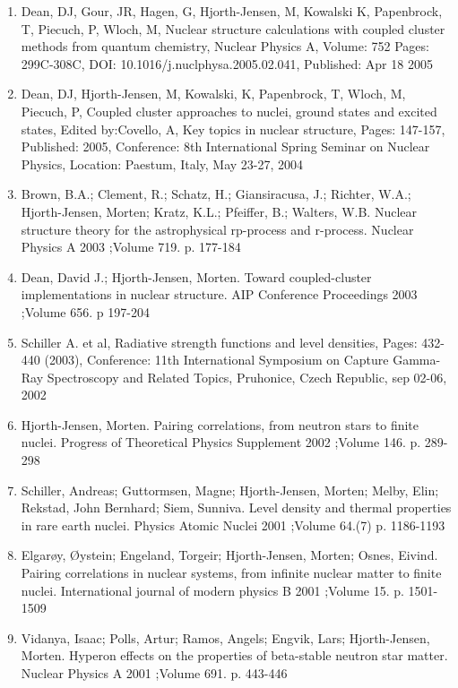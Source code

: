 \documentclass[a4wide,10pt]{article}
\begin{document}
\begin{enumerate}
\item Dean, DJ, Gour, JR, Hagen, G, Hjorth-Jensen, M, Kowalski K, Papenbrock, T, Piecuch, P, Wloch, M, Nuclear structure calculations with coupled cluster methods from quantum chemistry, Nuclear Physics A, Volume: 752  Pages: 299C-308C, DOI: 10.1016/j.nuclphysa.2005.02.041, Published: Apr 18 2005

\item Dean, DJ, Hjorth-Jensen, M, Kowalski, K, Papenbrock, T, Wloch, M, Piecuch, P, Coupled cluster approaches to nuclei, ground states and excited states, Edited by:Covello, A, Key topics in nuclear structure, Pages: 147-157, Published: 2005, Conference: 8th International Spring Seminar on Nuclear Physics, Location: Paestum, Italy, May 23-27, 2004

\item Brown, B.A.; Clement, R.; Schatz, H.; Giansiracusa, J.; Richter, W.A.; Hjorth-Jensen, Morten; Kratz, K.L.; Pfeiffer, B.; Walters, W.B.  Nuclear structure theory for the astrophysical rp-process and r-process. Nuclear Physics A 2003 ;Volume 719. p. 177-184

\item Dean, David J.; Hjorth-Jensen, Morten.  Toward coupled-cluster implementations in nuclear structure. AIP Conference Proceedings 2003 ;Volume 656. p 197-204

\item Schiller A. et al, Radiative strength functions and level densities, Pages: 432-440 (2003), Conference: 11th International Symposium on Capture Gamma-Ray Spectroscopy and Related Topics, Pruhonice, Czech Republic, sep 02-06, 2002

\item Hjorth-Jensen, Morten.  Pairing correlations, from neutron stars to finite nuclei. Progress of Theoretical Physics Supplement 2002 ;Volume 146. p. 289-298

\item Schiller, Andreas; Guttormsen, Magne; Hjorth-Jensen, Morten; Melby, Elin; Rekstad, John Bernhard; Siem, Sunniva. Level density and thermal properties in rare earth nuclei. Physics Atomic Nuclei 2001 ;Volume 64.(7) p. 1186-1193

\item Elgarøy, Øystein; Engeland, Torgeir; Hjorth-Jensen, Morten; Osnes, Eivind.  Pairing correlations in nuclear systems, from infinite nuclear matter to finite nuclei. International journal of modern physics B 2001 ;Volume 15. p. 1501-1509

\item Vidanya, Isaac; Polls, Artur; Ramos, Angels; Engvik, Lars; Hjorth-Jensen, Morten. Hyperon effects on the properties of beta-stable neutron star matter. Nuclear Physics A 2001 ;Volume 691. p. 443-446


\end{enumerate}
\end{document}
